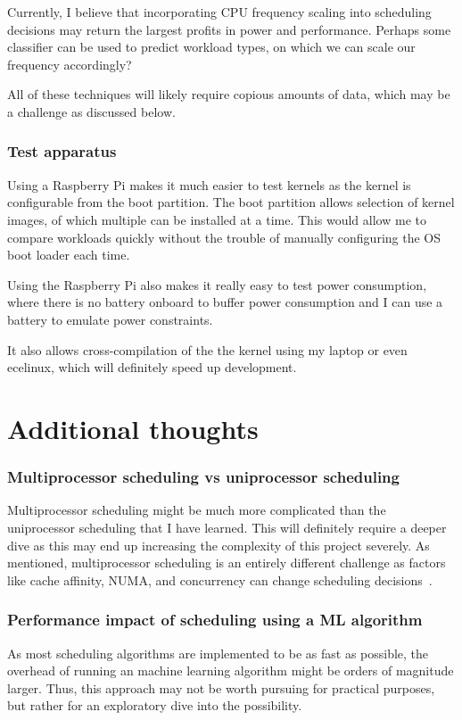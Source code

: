 \documentclass[12pt]{article}
\def\ind{\hspace*{0.3in}}
\begin{document}
Currently, I believe that incorporating CPU frequency scaling into scheduling decisions may return the largest profits in power and performance. Perhaps some classifier can be used to predict workload types, on which we can scale our frequency accordingly?

All of these techniques will likely require copious amounts of data, which may be a challenge as discussed below.

\subsubsection*{Test apparatus}

\ind Using a Raspberry Pi makes it much easier to test kernels as the kernel is configurable from the boot partition. The boot partition allows selection of kernel images, of which multiple can be installed at a time. This would allow me to compare workloads quickly without the trouble of manually configuring the OS boot loader each time.

Using the Raspberry Pi also makes it really easy to test power consumption, where there is no battery onboard to buffer power consumption and I can use a battery to emulate power constraints.

It also allows cross-compilation of the the kernel using my laptop or even ecelinux, which will definitely speed up development. 

\section*{Additional thoughts}

\subsubsection*{Multiprocessor scheduling vs uniprocessor scheduling}
\ind Multiprocessor scheduling might be much more complicated than the uniprocessor scheduling that I have learned. This will definitely require a deeper dive as this may end up increasing the complexity of this project severely. As mentioned, multiprocessor scheduling is an entirely different challenge as factors like cache affinity, NUMA, and concurrency can change scheduling decisions~\cite{CpuschedmultiPdf}.
\subsubsection*{Performance impact of scheduling using a ML algorithm}
\ind As most scheduling algorithms are implemented to be as fast as possible, the overhead of running an machine learning algorithm might be orders of magnitude larger. Thus, this approach may not be worth pursuing for practical purposes, but rather for an exploratory dive into the possibility.
\end{document}
